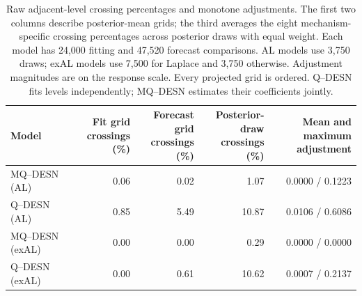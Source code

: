 \begin{table}[!htbp]
\centering
\footnotesize
\setlength{\tabcolsep}{2pt}
\renewcommand{\arraystretch}{1.08}
\begin{tabular}{@{}lrrrr@{}}
\toprule
Model & \shortstack{Fit grid\\crossings (\%)} & \shortstack{Forecast grid\\crossings (\%)} & \shortstack{Posterior-draw\\crossings (\%)} & \shortstack{Mean and maximum\\adjustment} \\
\midrule
MQ--DESN (AL) & 0.06 & 0.02 & 1.07 & 0.0000 / 0.1223 \\
Q--DESN (AL) & 0.85 & 5.49 & 10.87 & 0.0106 / 0.6086 \\
MQ--DESN (exAL) & 0.00 & 0.00 & 0.29 & 0.0000 / 0.0000 \\
Q--DESN (exAL) & 0.00 & 0.61 & 10.62 & 0.0007 / 0.2137 \\
\bottomrule
\end{tabular}
\caption{Raw adjacent-level crossing percentages and monotone adjustments. The first two columns describe posterior-mean grids; the third averages the eight mechanism-specific crossing percentages across posterior draws with equal weight. Each model has 24,000 fitting and 47,520 forecast comparisons. AL models use 3,750 draws; exAL models use 7,500 for Laplace and 3,750 otherwise. Adjustment magnitudes are on the response scale. Every projected grid is ordered. Q--DESN fits levels independently; MQ--DESN estimates their coefficients jointly.}
\label{qdesn2026:tab:joint-qdesn-pure-desn-v2-crossings}
\end{table}
